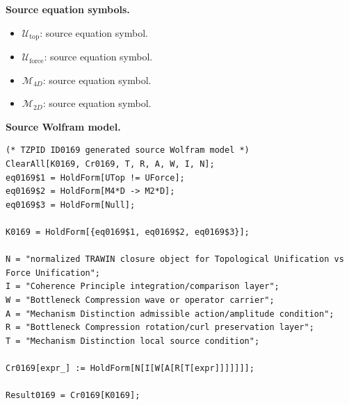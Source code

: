 \begin{minipage}[t]{0.49\linewidth}
\begingroup
\small
\raggedright
\textbf{Source equation symbols.}\par
\begin{itemize}[leftmargin=1.35em,itemsep=1pt,topsep=1pt,parsep=0pt]
    \item $\mathcal{U}_{\mathrm{top}}$: source equation symbol.
    \item $\mathcal{U}_{\mathrm{force}}$: source equation symbol.
    \item $\mathcal{M}_{4D}$: source equation symbol.
    \item $\mathcal{M}_{2D}$: source equation symbol.
\end{itemize}
\endgroup
\end{minipage}\hfill
\begin{minipage}[t]{0.47\linewidth}
\begingroup
\scriptsize
\raggedright
\textbf{Source Wolfram model.}\par
\begin{Verbatim}[fontsize=\tiny,breaklines=true,breakanywhere=true]
(* TZPID ID0169 generated source Wolfram model *)
ClearAll[K0169, Cr0169, T, R, A, W, I, N];
eq0169$1 = HoldForm[UTop != UForce];
eq0169$2 = HoldForm[M4*D -> M2*D];
eq0169$3 = HoldForm[Null];

K0169 = HoldForm[{eq0169$1, eq0169$2, eq0169$3}];

N = "normalized TRAWIN closure object for Topological Unification vs Force Unification";
I = "Coherence Principle integration/comparison layer";
W = "Bottleneck Compression wave or operator carrier";
A = "Mechanism Distinction admissible action/amplitude condition";
R = "Bottleneck Compression rotation/curl preservation layer";
T = "Mechanism Distinction local source condition";

Cr0169[expr_] := HoldForm[N[I[W[A[R[T[expr]]]]]]];

Result0169 = Cr0169[K0169];
\end{Verbatim}
\endgroup
\end{minipage}

